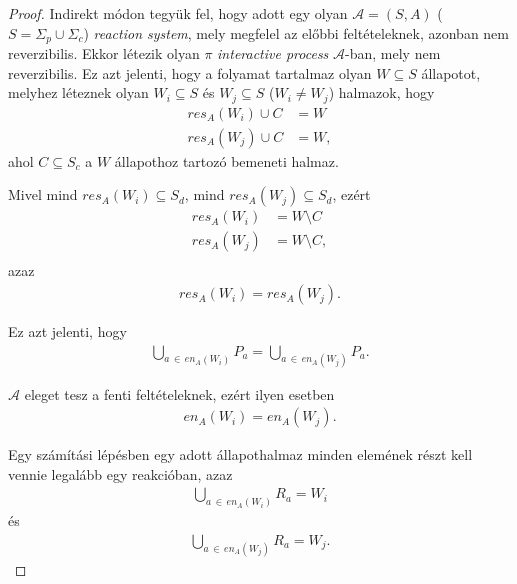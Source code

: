 \documentclass[12pt]{article}
\theoremstyle{definition}
\theoremstyle{remark}
\theoremstyle{plain}
\theoremstyle{remark}
\theoremstyle{plain}
\newcommand{\en}{\textit{en}}
\newcommand{\res}{\textit{res}}
\begin{document}
    \begin{proof}
        Indirekt módon tegyük fel, hogy adott egy olyan $\mathscr{A}=(S, A)$ ($S = \Sigma_{p} \cup \Sigma_{c}$) \textit{reaction system}, mely megfelel az előbbi feltételeknek, azonban nem reverzibilis. Ekkor létezik olyan $\pi$ \textit{interactive process} $\mathscr{A}$-ban, mely nem reverzibilis. Ez azt jelenti, hogy a folyamat tartalmaz olyan $W \subseteq S$ állapotot, melyhez léteznek olyan $W_{i} \subseteq S$ és $W_{j} \subseteq S$ ($W_{i} \neq W_{j}$) halmazok, hogy
        \begin{align*}
            \res_{A}(W_{i}) \cup C &= W \\
            \res_{A}(W_{j}) \cup C &= W,
        \end{align*}
        ahol $C \subseteq S_{c}$ a $W$ állapothoz tartozó bemeneti halmaz. 
        
        Mivel mind $\res_{A}(W_{i}) \subseteq S_{d}$, mind $\res_{A}(W_{j}) \subseteq S_{d}$, ezért
        \begin{align*}
            \res_{A}(W_{i}) &= W \setminus C \\
            \res_{A}(W_{j}) &= W \setminus C, \\
        \end{align*}
        azaz
        \begin{align*}
            \res_{A}(W_{i}) = \res_{A}(W_{j}).
        \end{align*}

        Ez azt jelenti, hogy
        \begin{align*}
            \bigcup\limits_{a \,\in\, \en_{A}(W_{i})}P_{a} = \bigcup\limits_{a \,\in\, \en_{A}(W_{j})}P_{a}.
        \end{align*}

        $\mathscr{A}$ eleget tesz a fenti feltételeknek, ezért ilyen esetben
        \begin{align*}
            \en_{A}(W_{i}) = \en_{A}(W_{j}).
        \end{align*}

        Egy számítási lépésben egy adott állapothalmaz minden elemének részt kell vennie legalább egy reakcióban, azaz
        \begin{align*}
            \bigcup\limits_{a \,\in\, \en_{A}(W_{i})} R_{a} = W_{i}
        \end{align*}
        és
        \begin{align*}
            \bigcup\limits_{a \,\in\, \en_{A}(W_{j})} R_{a} = W_{j}.
        \end{align*}


\end{proof}
\end{document}
